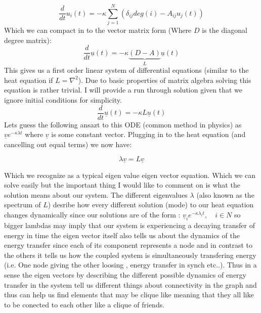 \documentclass[8pt,twocolumn]{article}
\begin{document}
\[
\frac{d}{dt}u_{i}(t) = -\kappa \sum_{j=1}^{N}(\delta_{ij} deg(i) -A_{ij}u_{j}(t))
\]
Which we can compact in to the vector matrix form (Where $D$ is the diagonal degree matrix):
\[
\frac{d}{dt}\underline{u}(t) = -\kappa\underbrace{(D -A)}_{L}\underline{u}(t)
\]
This gives us a first order linear system of differential equations (similar to the heat equation if $L = \nabla^{2}$). Due to basic properties of matrix algebra solving this equation is rather trivial. I will provide a run through solution given that we ignore initial conditions for simplicity.
\[
\frac{d}{dt}\underline{u}(t) = -\kappa L\underline{u}(t)
\]
Lets guess the following ansazt to this ODE (common method in physics) as $\underline{v}e^{-\kappa\lambda t}$ where $\underline{v}$ is some constant vector. Plugging in to the heat equation (and cancelling out equal terms) we now have:

\[
 \lambda \underline{v} = L \underline{v}
\]

Which we recognize as a typical eigen value eigen vector equation. Which we can solve easily but the important thing I would like to comment on is what the solution means about our system. The different eigenvalues $\lambda$ (also known as the spectrum of $L$) desribe how every different solution (mode) to our heat equation changes dynamically since our solutions are of the form :  $\underline{v}_{i}e^{-\kappa\lambda_{i} t}, \quad i \in N$ so bigger lambdas may imply that our system is experiencing a decaying transfer of energy in time the eigen vector itself also tells us about the dynamics of the energy transfer since each of its component represents a node and in contrast to the others it tells us how the coupled system is simultaneously transfering energy (i.e. One node giving the other loosing , energy transfer in synch etc..). Thus in a sense the eigen vectors by describing the different possible dynamics of energy transfer in the system tell us different things about connectivity in the graph and thus can  help us find elements that may be clique like meaning that they all like to be conected to each other like a clique of friends.
\end{document}
